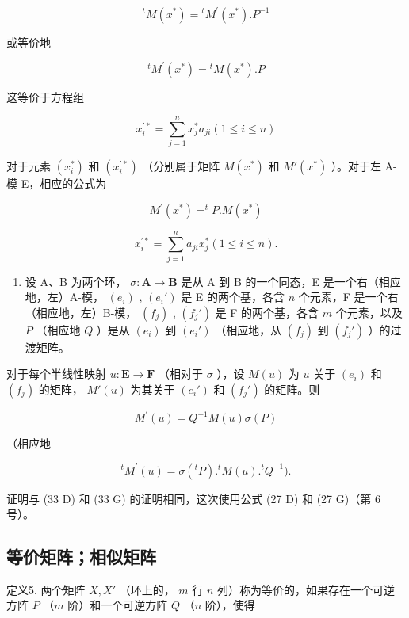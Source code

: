 \[
{ } ^ { t } M ( x ^ { * } ) = { } ^ { t } M ^ { \prime } ( x ^ { * } ) . P ^ { - 1 }
\]

或等价地

\[
{ } ^ { t } M ^ { \prime } ( x ^ { * } ) = { } ^ { t } M ( x ^ { * } ) . P\tag{37 D}
\]

这等价于方程组

\[
x _ {i} ^ {\prime *} = \sum_ {j = 1} ^ {n} x _ {j} ^ {*} a _ {j i} (1 \leqslant i \leqslant n)\tag{38 D}
\]

对于元素 \((x_{i}^{*})\) 和 \((x_{i}^{\prime *})\) （分别属于矩阵 \(M(x^{*})\) 和 \(M'(x^{*})\) ）。对于左 A-模 E，相应的公式为

\[
M ^ {\prime} (x ^ {*}) = ^ {t} P. M (x ^ {*})\tag{37 G}
\]

\[
x _ {i} ^ {\prime *} = \sum_ {j = 1} ^ {n} a _ {j i} x _ {j} ^ {*} (1 \leqslant i \leqslant n).\tag{38 G}
\]

\begin{enumerate}
\def\labelenumi{(\arabic{enumi})}
\setcounter{enumi}{2}
\tightlist
\item
  设 A、B 为两个环， \(\sigma: \mathbf{A} \to \mathbf{B}\) 是从 A 到 B 的一个同态，E 是一个右（相应地，左）A-模， \((e_i)\) , \((e_i')\) 是 E 的两个基，各含 \(n\) 个元素，F 是一个右（相应地，左）B-模， \((f_j)\) , \((f_j')\) 是 F 的两个基，各含 \(m\) 个元素，以及 \(P\) （相应地 \(Q\) ）是从 \((e_i)\) 到 \((e_i')\) （相应地，从 \((f_j)\) 到 \((f_j')\) ）的过渡矩阵。
\end{enumerate}

对于每个半线性映射 \(u: \mathbf{E} \to \mathbf{F}\) （相对于 \(\sigma\) ），设 \(M(u)\) 为 \(u\) 关于 \((e_i)\) 和 \((f_j)\) 的矩阵， \(M'(u)\) 为其关于 \((e_i')\) 和 \((f_j')\) 的矩阵。则

\[
M ^ {\prime} (u) = Q ^ {- 1} M (u) \sigma (P)\tag{39 D}
\]

（相应地

\[
{ } ^ { t } M ^ { \prime } ( u ) = \sigma ( { } ^ { t } P ) . { } ^ { t } M ( u ) . { } ^ { t } Q ^ { - 1 } ) .\tag{39 G}
\]

证明与 (33 D) 和 (33 G) 的证明相同，这次使用公式 (27 D) 和 (27 G)（第 6 号）。

\subsection{等价矩阵；相似矩阵}

定义5. 两个矩阵 \(X, X'\) （环上的， \(m\) 行 \(n\) 列）称为等价的，如果存在一个可逆方阵 \(P\) （\(m\) 阶）和一个可逆方阵 \(Q\) （\(n\) 阶），使得

